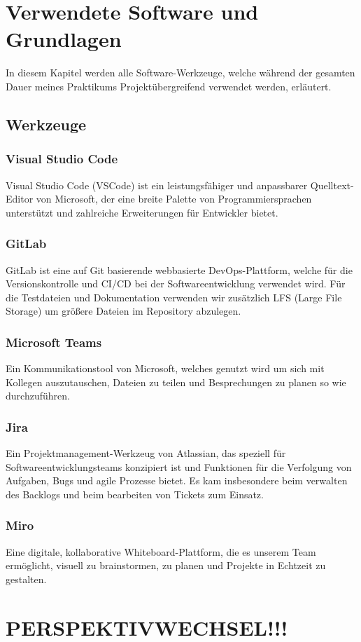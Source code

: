 \section{Verwendete Software und Grundlagen}
In diesem Kapitel werden alle Software-Werkzeuge, welche während der gesamten Dauer meines Praktikums Projektübergreifend
verwendet werden, erläutert.


\subsection{Werkzeuge}

\subsubsection{Visual Studio Code}
Visual Studio Code (VSCode) ist ein leistungsfähiger und anpassbarer Quelltext-Editor von Microsoft, der eine breite
Palette von Programmiersprachen unterstützt und zahlreiche Erweiterungen für Entwickler bietet. 

\subsubsection{GitLab}
GitLab ist eine auf Git basierende webbasierte DevOps-Plattform, welche für die Versionskontrolle und CI/CD bei der
Softwareentwicklung verwendet wird. Für die Testdateien und Dokumentation verwenden wir zusätzlich LFS (Large File
Storage) um größere Dateien im Repository abzulegen.

\subsubsection{Microsoft Teams}
Ein Kommunikationstool von Microsoft, welches genutzt wird um sich mit Kollegen auszutauschen, Dateien zu teilen und
Besprechungen zu planen so wie durchzuführen.

\subsubsection{Jira}
Ein Projektmanagement-Werkzeug von Atlassian, das speziell für Softwareentwicklungsteams konzipiert ist und Funktionen
für die Verfolgung von Aufgaben, Bugs und agile Prozesse bietet. Es kam insbesondere beim verwalten des Backlogs und
beim bearbeiten von Tickets zum Einsatz.

\subsubsection{Miro}
Eine digitale, kollaborative Whiteboard-Plattform, die es unserem Team ermöglicht, visuell zu brainstormen, zu planen
und Projekte in Echtzeit zu gestalten.

\section{PERSPEKTIVWECHSEL!!!}